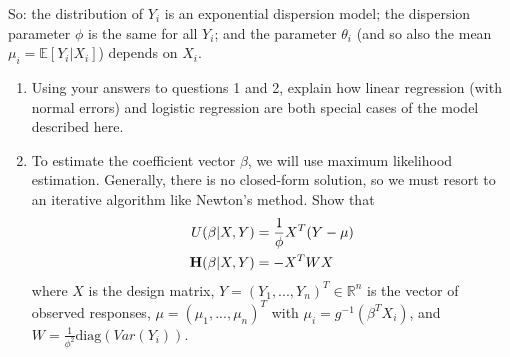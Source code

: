 \documentclass[11pt]{article}
\begin{document}
\begin{enumerate}
\noindent So: the distribution of $Y_i$ is an exponential dispersion model; the dispersion parameter $\phi$ is the same for all $Y_i$; and the parameter $\theta_i$ (and so also the mean $\mu_i = \mathbb{E}[Y_i | X_i]$) depends on $X_i$.

\begin{enumerate}
\item Using your answers to questions 1 and 2, explain how linear regression (with normal errors) and logistic regression are both special cases of the model described here.

\item To estimate the coefficient vector $\beta$, we will use maximum likelihood estimation. Generally, there is no closed-form solution, so we must resort to an iterative algorithm like Newton's method. Show that
\begin{align*}
U(\beta | X, Y) &= \frac{1}{\phi} X^T(Y - \mu) \\
{\bf H}(\beta | X, Y) &= -X^T W X
\end{align*}
where $X$ is the design matrix, $Y = (Y_1,...,Y_n)^T \in \mathbb{R}^n$ is the vector of observed responses, $\mu = (\mu_1,...,\mu_n)^T$ with $\mu_i = g^{-1}(\beta^T X_i)$, and $W = \frac{1}{\phi^2} \text{diag}(Var(Y_i))$.
\end{enumerate}

\end{enumerate}
\end{document}
